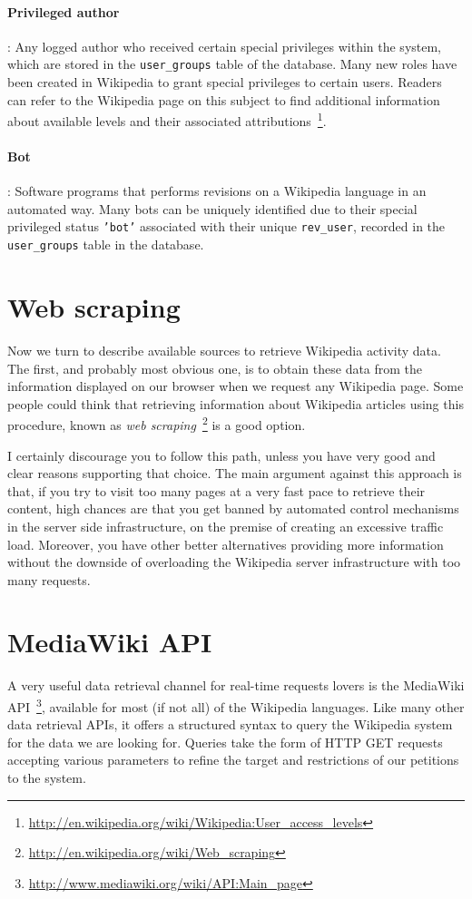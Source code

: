 \paragraph{Privileged author}: Any logged author who received certain special privileges within
the system, which are stored in the \texttt{user\_groups} table of the database. Many new roles
have been created in Wikipedia to grant special privileges to certain users. Readers can refer
to the Wikipedia page on this subject to find additional information about available levels
and their associated attributions~\footnote{\url{http://en.wikipedia.org/wiki/Wikipedia:User_access_levels}}.

\paragraph{Bot}: Software programs that performs revisions on a Wikipedia language 
in an automated way. Many bots can be uniquely identified due to their special
privileged status \texttt{'bot'} associated with their unique \texttt{rev\_user}, 
recorded in the \texttt{user\_groups} table in the database.

\section{Web scraping}
Now we turn to describe available sources to retrieve Wikipedia activity
data. The first, and probably most obvious one, is to obtain these data from the
information displayed on our browser when we request any Wikipedia page. Some
people could think that retrieving information about Wikipedia articles using
this procedure, known as \textit{web scraping}~\footnote{\url{http://en.wikipedia.org/wiki/Web_scraping}}
is a good option.

I certainly discourage you to follow this path, unless you have very good and
clear reasons supporting that choice. The main argument against this approach is that, if
you try to visit too many pages at a very fast pace to retrieve their content, high
chances are that you get banned by automated control mechanisms in the server
side infrastructure, on the premise of creating an excessive traffic load. 
Moreover, you have other better alternatives providing more information without
the downside of overloading the Wikipedia server infrastructure with too
many requests.

\section{MediaWiki API}
A very useful data retrieval channel for real-time requests lovers is the
MediaWiki API~\footnote{\url{http://www.mediawiki.org/wiki/API:Main_page}}, available
for most (if not all) of the Wikipedia languages. Like many other data retrieval
APIs, it offers a structured syntax to query the Wikipedia system for the
data we are looking for. Queries take the form of HTTP GET requests accepting
various parameters to refine the target and restrictions of our petitions to the 
system.

